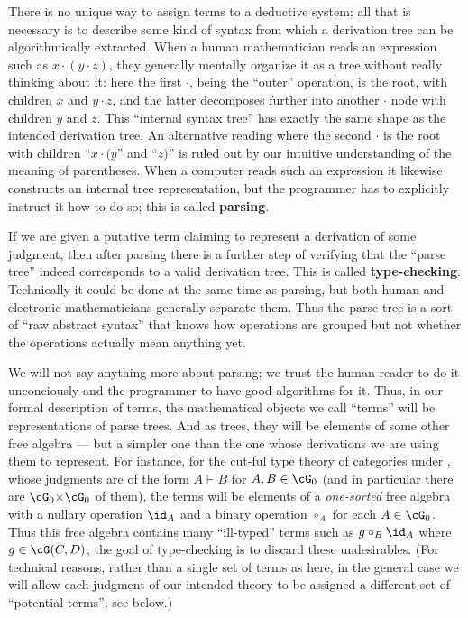 \documentclass{book}
\let\types\vdash
\begin{document}
There is no unique way to assign terms to a deductive system; all that is necessary is to describe some kind of syntax from which a derivation tree can be algorithmically extracted.
When a human mathematician reads an expression such as $x\cdot (y\cdot z)$, they generally mentally organize it as a tree without really thinking about it: here the first $\cdot$, being the ``outer'' operation, is the root, with children $x$ and $y\cdot z$, and the latter decomposes further into another $\cdot$ node with children $y$ and $z$.
This ``internal syntax tree'' has exactly the same shape as the intended derivation tree.
An alternative reading where the second $\cdot$ is the root with children ``$x\cdot (y$'' and ``$z)$'' is ruled out by our intuitive understanding of the meaning of parentheses.
When a computer reads such an expression it likewise constructs an internal tree representation, but the programmer has to explicitly instruct it how to do so; this is called \textbf{parsing}.

If we are given a putative term claiming to represent a derivation of some judgment, then after parsing there is a further step of verifying that the ``parse tree'' indeed corresponds to a valid derivation tree.
This is called \textbf{type-checking}.
Technically it could be done at the same time as parsing, but both human and electronic mathematicians generally separate them.
Thus the parse tree is a sort of ``raw abstract syntax'' that knows how operations are grouped but not whether the operations actually mean anything yet.

We will not say anything more about parsing; we trust the human reader to do it unconciously and the programmer to have good algorithms for it.
Thus, in our formal description of terms, the mathematical objects we call ``terms'' will be representations of parse trees.
And as trees, they will be elements of some other free algebra --- but a simpler one than the one whose derivations we are using them to represent.
For instance, for the cut-ful type theory of categories under \cG, whose judgments are of the form $A\types B$ for $A,B\in\cG_0$ (and in particular there are $\cG_0\times \cG_0$ of them), the terms will be elements of a \emph{one-sorted} free algebra with a nullary operation $\id_A$ and a binary operation $\circ_A$ for each $A\in\cG_0$.
Thus this free algebra contains many ``ill-typed'' terms such as $g\circ_B \id_A$ where $g\in\cG(C,D)$; the goal of type-checking is to discard these undesirables.
(For technical reasons, rather than a single set of terms as here, in the general case we will allow each judgment of our intended theory to be assigned a different set of ``potential terms''; see below.)
\end{document}
